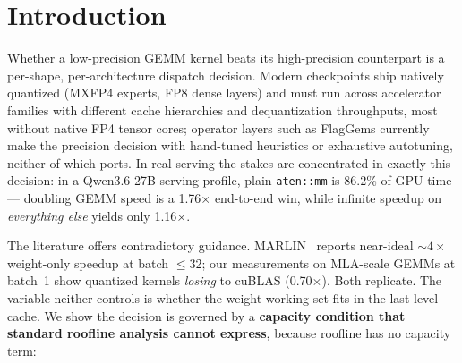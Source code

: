 \documentclass[10pt,twocolumn]{article}
\begin{document}
\begin{abstract}
Two boundary conditions temper the gate.  First, under full-model serving contention the L2-resident regime \emph{collapses as a step function} once the sum of hot working sets exceeds the effective capacity --- so isolated-microbenchmark crossovers (ours included) are optimistic in production, and the gate's ``quantization does not pay'' branch is a microbenchmark and small-model regime on today's H100, but an expanding one as LLC capacities grow (measured effective capacity: A100 31.2~MB $\to$ H100 39.8~MB $\to$ B200 90.3~MB $\to$ B300 91.6~MB; fine-grid fractions cluster by family --- Hopper ${\approx}0.80$, dual-die Blackwell ${\approx}0.71$--$0.72$).  Second, a roofline is necessary but not sufficient for precision dispatch: we document five kernel-implementation mechanisms (tile-starvation floors, wave-quantization bands, dispatch splits, occupancy floors, per-tile re-dequantization staircases) that each independently flip the win/loss sign, motivating dispatch = CARM + per-kernel predicates.  MLA reconstruction GEMMs, the original subject of this study, appear as one case study of the gate.  All code and data are publicly available.
\end{abstract}

\section{Introduction}

Whether a low-precision GEMM kernel beats its high-precision counterpart is a per-shape, per-architecture dispatch decision.  Modern checkpoints ship natively quantized (MXFP4 experts, FP8 dense layers) and must run across accelerator families with different cache hierarchies and dequantization throughputs, most without native FP4 tensor cores; operator layers such as FlagGems currently make the precision decision with hand-tuned heuristics or exhaustive autotuning, neither of which ports.  In real serving the stakes are concentrated in exactly this decision: in a Qwen3.6-27B serving profile, plain \texttt{aten::mm} is 86.2\% of GPU time --- doubling GEMM speed is a 1.76$\times$ end-to-end win, while infinite speedup on \emph{everything else} yields only 1.16$\times$.

The literature offers contradictory guidance.  MARLIN~\cite{marlin} reports near-ideal ${\sim}4\times$ weight-only speedup at batch $\leq$32; our measurements on MLA-scale GEMMs at batch~1 show quantized kernels \emph{losing} to cuBLAS (0.70$\times$).  Both replicate.  The variable neither controls is whether the weight working set fits in the last-level cache.  We show the decision is governed by a \textbf{capacity condition that standard roofline analysis cannot express}, because roofline has no capacity term:
\end{document}
